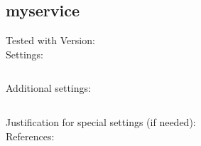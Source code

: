 \subsection{myservice}


\begin{description}
\item[Tested with Version:]

\item[Settings:] \mbox{}

\begin{lstlisting}[breaklines]
	%Here goes your setting string
\end{lstlisting}

\item[Additional settings:]


\begin{lstlisting}[breaklines]
	%copy \& paste additional settings
\end{lstlisting}

\item[Justification for special settings (if needed):]


\item[References:]


\end{description}

